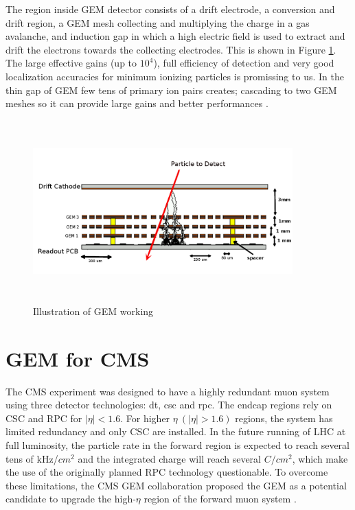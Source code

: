 The region inside GEM detector consists of a drift electrode, a conversion and drift region, a GEM mesh collecting and multiplying the charge in a gas avalanche, and induction gap in which a high electric field is used to extract and drift the electrons towards the collecting electrodes. This is shown in Figure \ref{gemgaps}. The large effective gains (up to $10^4$), full efficiency of detection and very good localization accuracies for minimum ionizing particles is promissing to us. In the thin gap of GEM few tens of primary ion pairs creates; cascading to two GEM meshes so it can provide large gains and better performances \cite{Bressan1999}.
\begin{figure}[htb]
	\begin{center}
		\includegraphics[width=10.0cm,height=7cm]{figures/GEM/triple_gem.png}
		\caption{Illustration of GEM working}
		\label{gemgaps}
	\end{center}
\end{figure} 

\section{GEM for CMS}
The CMS experiment was designed to have a highly redundant muon system using three detector technologies: {dt}, {csc} and {rpc}. The endcap regions rely on CSC and RPC for $|\eta|<1.6$. For higher $\eta~ (|\eta|>1.6)$ regions, the system has limited redundancy and only CSC are installed. In the future running of LHC at full luminosity, the particle rate in the forward region is expected to reach several tens of kHz/$cm^2$ and the integrated charge will reach several $C/cm^2$, which make the use of the originally planned RPC technology questionable. To overcome these limitations, the CMS GEM collaboration proposed the GEM as a potential candidate to upgrade the high-$\eta$ region of the forward muon system \cite{Colaleo:2021453}. 

